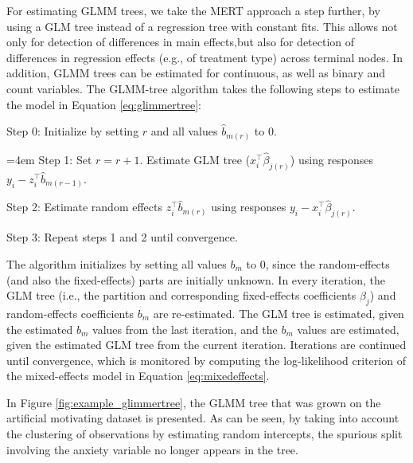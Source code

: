 \documentclass[nobf,doc]{apa}
\begin{document}
For estimating GLMM trees, we take the MERT approach a step further, by using a GLM tree instead of a regression tree with constant fits. This allows not only for detection of differences in main effects,but also for detection of differences in regression effects (e.g., of treatment type) across terminal nodes. In addition, GLMM trees can be estimated for continuous, as well as binary and count variables. The GLMM-tree algorithm takes the following steps to estimate the model in Equation \ref{eq:glimmertree}:

\vspace{5pt}
\noindent Step 0: Initialize by setting $r$ and all values $\hat{b}_{m(r)}$ to 0.

\vspace{5pt}
\noindent \hangindent=4em Step 1: Set $r = r+1$. Estimate GLM tree ($x_{i}^{\top}\hat{\beta}_{j(r)}$) using responses $y_i - z_{i}^{\top}\hat{b}_{m(r-1)}$.

\vspace{5pt}
\noindent Step 2: Estimate random effects $z_{i}^{\top}\hat{b}_{m(r)}$ using responses $y_i - x_{i}^{\top}\hat{\beta}_{j(r)}$.

\vspace{5pt}
\noindent Step 3: Repeat steps 1 and 2 until convergence.

\vspace{5pt}
The algorithm initializes by setting all values $b_m$ to $0$, since the random-effects (and also the fixed-effects) parts are initially unknown. In every iteration, the GLM tree (i.e., the partition and corresponding fixed-effects coefficients $\beta_j$) and random-effects coefficients $b_m$ are re-estimated. The GLM tree is estimated, given the estimated $b_m$ values from the last iteration, and the $b_m$ values are estimated, given the estimated GLM tree from the current iteration. Iterations are continued until convergence, which is monitored by computing the log-likelihood criterion of the mixed-effects model in Equation \ref{eq:mixedeffects}. 

In Figure \ref{fig:example_glimmertree}, the GLMM tree that was grown on the artificial motivating dataset is presented. As can be seen, by taking into account the clustering of observations by estimating random intercepts, the spurious split involving the anxiety variable no longer appears in the tree. 
\end{document}
